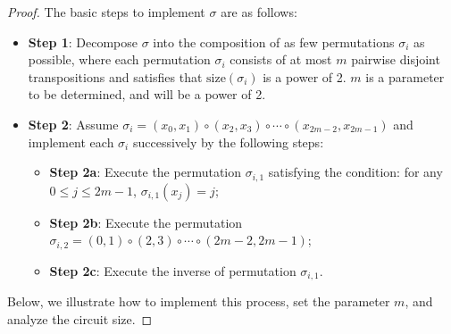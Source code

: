\documentclass[a4paper,UKenglish,cleveref, autoref, thm-restate]{lipics-v2021}
\begin{document}
\begin{proof}

The basic steps  to implement $\sigma$ are as follows:
\begin{itemize}
    \item \textbf{Step 1}: Decompose $\sigma$ into the composition of as few permutations $\sigma_i$ as possible, where each permutation $\sigma_i$ consists of at most $m$ pairwise disjoint transpositions and satisfies that $\mathrm{size}(\sigma_i)$ is a power of 2. $m$ is a parameter to be determined, and will be a power of 2.\label{step1}
    
    \item \textbf{Step 2}: Assume $\sigma_i = (x_0, x_1) \circ  (x_2, x_3) \circ \cdots \circ (x_{2m-2}, x_{2m-1})$ and implement each $\sigma_i$ successively by the following steps: 
    \begin{itemize}
        \item \textbf{Step 2a}: Execute the permutation $\sigma_{i,1}$ satisfying the condition: for any $0 \leq j \leq 2m-1$, $\sigma_{i,1}(x_j) = j$;
        \item \textbf{Step 2b}: Execute the permutation $\sigma_{i,2} = (0, 1) \circ (2, 3) \circ \cdots \circ (2m-2, 2m-1)$;
        \item \textbf{Step 2c}: Execute the inverse of permutation $\sigma_{i,1}$.
    \end{itemize}
\end{itemize}
Below, we illustrate how to implement this process, set the parameter $m$, and analyze the circuit size.


\end{proof}
\end{document}
